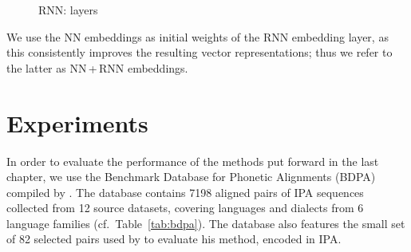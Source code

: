 \documentclass[a4paper]{report}
\begin{document}
\begin{figure}[h]
	\centering\small


	\caption{RNN: layers}
	\label{fig:rnn}
\end{figure}

We use the NN embeddings as initial weights of the RNN embedding layer, as this consistently improves the resulting vector representations;
thus we refer to the latter as NN\,+\,RNN embeddings.


\chapter{Experiments}

In order to evaluate the performance of the methods put forward in the last chapter,
we use the Benchmark Database for Phonetic Alignments (BDPA) compiled by \citet{2014_List_Prokić}.
The database contains 7198 aligned pairs of IPA sequences collected from 12 source datasets,
covering languages and dialects from 6 language families (cf.~Table~\ref{tab:bdpa}).
The database also features the small set of 82 selected pairs used by \citet{1996_Covington} to evaluate his method, encoded in IPA.
\end{document}
